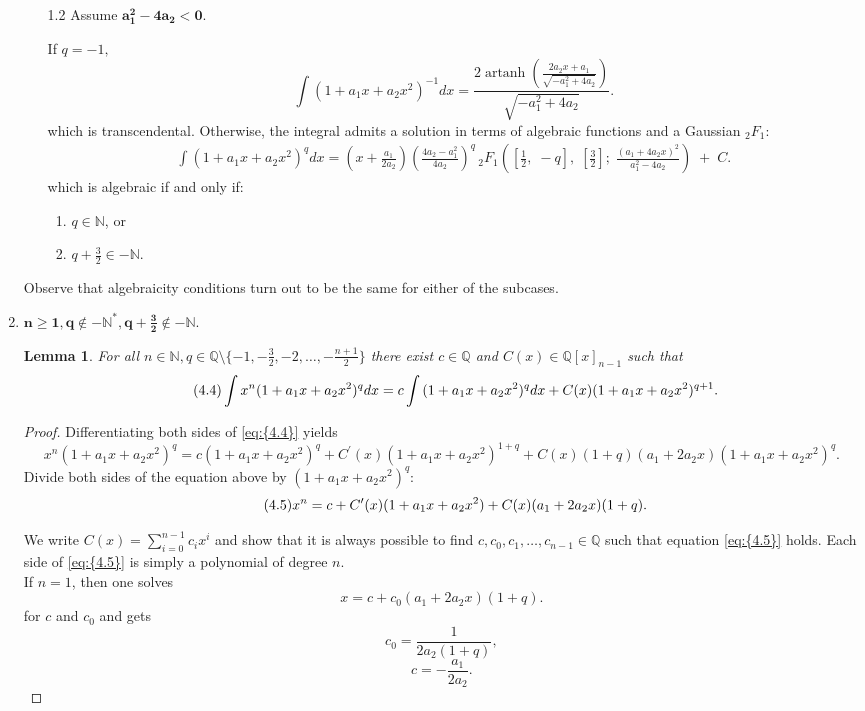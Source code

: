 \documentclass[11pt]{article}
\theoremstyle{definition}
\theoremstyle{plain}
\newtheorem{lem}[defi]{Lemma}
\theoremstyle{remark}
\begin{document}
\begin{enumerate}
\begin{itemize}
\item[1.2] Assume $\mathbf{a_1^2-4a_2<0}$.

If $q=-1,$
\[\int{(1+a_1x+a_2x^2)^{-1} dx} = \frac{2\operatorname{artanh}\left
(\frac{2a_2x + a_1}{\sqrt{-a_1^2 + 4a_2}}\right)}{\sqrt{-a_1^2 + 4a_2}}.\]
which is transcendental.
Otherwise, the integral admits a solution in terms of algebraic functions and a Gaussian $_2F_1$:
\begin{align*}
\int{(1+a_1x+a_2x^2)^q dx} = 
\left(x+\frac{a_1}{2a_2}\right)\left(\frac{4a_2-a_1^2}{4a_2}\right)^q\,
{}_2F_{1}\!\left(\left[
      \frac{1}{2},\;
     -q\right],\;
      \left[\frac{3}{2}\right];\;
      \frac{(a_1+4a_2x)^2}{a_1^2-4a_2}
\right)
\;+\;C.
\end{align*}
which is algebraic if and only if:
\begin{enumerate}
\item $q \in \mathbb{N}$, or
\item $q + \frac{3}{2} \in -\mathbb{N}$.
\end{enumerate}
\end{itemize}
Observe that algebraicity conditions turn out to be the same for either of the subcases.

\item $\mathbf{n \geq 1, q\notin -\mathbb{N}^*, q+\frac{3}{2}\notin -\mathbb{N}}$.
\begin{lem}\label{lem:comb1}
For all $n \in \mathbb{N}, q\in\mathbb{Q}\setminus\{-1,-\frac{3}{2},-2,\ldots,-\frac{n+1}{2}\}$ there exist $c \in \mathbb{Q}$ and $ C(x) \in \mathbb{Q}[x]_{n-1}$ such that
\begin{equation}\label{eq:{4.4}}\tag{4.4}
\int{x^n (1+a_1x+a_2x^2)^q dx} = c\int{(1+a_1x+a_2x^2)^qdx} + C(x)(1+a_1x+a_2x^2)^{q+1}.
\end{equation}
\end{lem}
\begin{proof}
Differentiating both sides of \eqref{eq:{4.4}} yields
\[x^n (1+a_1x+a_2x^2)^q = c(1+a_1x+a_2x^2)^q+ C^\prime(x)(1+a_1x+a_2x^2)^{1+q} + C(x)(1+q)(a_1+2a_2x)(1+a_1x+a_2x^2)^{q}.\]
Divide both sides of the equation above by $(1+a_1x+a_2x^2)^q$:
\begin{equation} \label{eq:{4.5}}\tag{4.5}
x^n = c + C^\prime(x)(1+a_1x+a_2x^2) + C(x)(a_1+2a_2x)(1+q).
\end{equation}

We write $C(x) = \sum\limits_{i=0}^{n-1}c_ix^i$ and show that it is always possible to find $c, c_0, c_1, \ldots, c_{n-1} \in \mathbb{Q}$ such that equation \eqref{eq:{4.5}} holds. 
Each side of \eqref{eq:{4.5}} is simply a polynomial of degree $n$. \\
If $n=1$, then one solves
\[x = c + c_0(a_1+2a_2x)(1+q).\]
for $c$ and $c_0$ and gets
\[c_0 = \frac{1}{2a_2(1+q)},\]
\[c = -\frac{a_1}{2a_2}.\]


\end{proof}
\end{enumerate}
\end{document}
